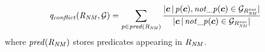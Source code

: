 \begin{equation}
\mi{q_{conflict}(R_{\mi{NM}},\cG)=\sum_{p\in pred(R_{NM})} \dfrac{|\vec{c}\,|\,p(\vec{c}),not\_p(\vec{c})\in \cG_{R_{\mi{NM}}^{\mi{aux}}}|}{|\vec{c}\,|\,not\_p(\vec{c})\in \cG_{R_{\mi{NM}}^{\mi{aux}}}|}}
\end{equation}
where $\mathit{pred(R_{NM})}$ stores predicates appearing in $R_{\mathit{NM}}$.

